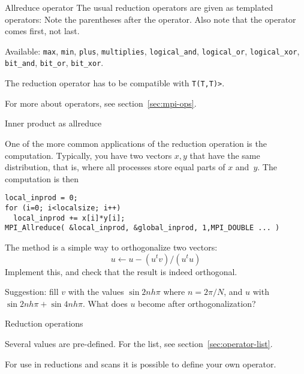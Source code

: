 \begin{mplnote}{Allreduce operator}
  The usual reduction operators are given as templated operators:
  Note the parentheses after the operator.
  Also note that the operator comes first, not last.

  Available: \lstinline{max}, \lstinline{min}, \lstinline{plus}, \lstinline{multiplies},
  \lstinline{logical_and}, \lstinline{logical_or}, \lstinline{logical_xor},
  \lstinline{bit_and}, \lstinline{bit_or}, \lstinline{bit_xor}.

  \begin{mplimpl}
    The reduction operator has to be compatible with
    \lstinline+T(T,T)>+.
  \end{mplimpl}
\end{mplnote}

For more about operators, see section~\ref{sec:mpi-ops}.

 {Inner product as allreduce}
\label{sec:dist-reduc}

One of the more common applications of the reduction operation
is the  computation. Typically, you have two vectors $x,y$
that have the same distribution, that is,
where all processes store equal parts of $x$ and~$y$.
The computation is then
\begin{lstlisting}
local_inprod = 0;
for (i=0; i<localsize; i++)
  local_inprod += x[i]*y[i];
MPI_Allreduce( &local_inprod, &global_inprod, 1,MPI_DOUBLE ... ) 
\end{lstlisting}

\begin{exercise}
  \label{ex:gramschmidt}
  The  method is a simple way to orthogonalize
  two vectors:
  \[ u \leftarrow u- (u^tv)/(u^tu) \]
  Implement this, and check that the result is indeed orthogonal.

  Suggestion: fill $v$ with the values $\sin 2nh\pi$ where $n=2\pi/N$,
  and $u$ with $\sin 2nh\pi + \sin 4nh\pi$. What does $u$ become after orthogonalization?
\end{exercise}

 {Reduction operations}
\label{sec:mpi:op-reduct}

Several  values are pre-defined. For the list,
see section~\ref{sec:operator-list}.

For use in reductions and scans it is possible to define your own operator.

